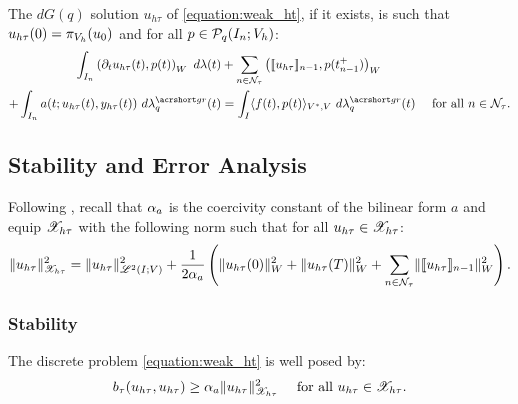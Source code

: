 \begin{proposition}[Localization]
    The $dG(q)$ solution $u_{h \tau}$ of \cref{equation:weak_ht}, if it exists, is such that $u_{h \tau}(0) = \pi_{V_h}(u_0)$ and for all $p \in \mathcal{P}_{q}(I_n; V_h)$:
    \begin{align}
        \int_{I_n} \left( \partial_t u_{h \tau}(t), p(t) \right)_W ~ d \lambda(t) & + \sum_{n \in \TimeIndices} \left( \llbracket u_{h \tau} \rrbracket_{n - 1}, p(t_{n - 1}^+) \right)_W \notag \\
        + \int_{I_n} a(t; u_{h \tau}(t), y_{h \tau}(t)) ~ d \lambdaGR_q(t) & = \int_I \langle f(t), p(t) \rangle_{V^*, V} ~ d \lambdaGR_q(t) &\text{ for all } n \in \TimeIndices.
    \end{align}
\end{proposition}

\newpage
\subsection{Stability and Error Analysis} \label{subsection:method_analysis}

Following \cite[p.~186]{Ern2021}, recall that $\alpha_{a}$ is the coercivity constant of the bilinear form $a$ and equip $\mathscr{X}_{h \tau}$ with the following norm such that for all $u_{h \tau} \in \mathscr{X}_{h \tau}$:
\begin{align}
    \lVert u_{h \tau} \rVert_{\mathscr{X}_{h \tau}}^2 = \lVert u_{h \tau} \rVert_{\mathscr{L}^{2}(I; V)}^2 + \frac{1}{2 \alpha_{a}} \left( \lVert u_{h \tau}(0) \rVert_W^2 + \lVert u_{h \tau}(T) \rVert_W^2 + \sum_{n \in \mathcal{N}_{\tau}} \lVert \llbracket u_{h \tau} \rrbracket_{n - 1} \rVert_W^2 \right). \label{eq:norm_ht}
\end{align}

\subsubsection{Stability}

\begin{lemma}[Coercivity]
    The discrete problem \cref{equation:weak_ht} is well posed by:
    \begin{align}
        b_{\tau}(u_{h \tau}, u_{h \tau}) &\geq \alpha_{a} \lVert u_{h \tau} \rVert_{\mathscr{X}_{h \tau}}^2 &\text{ for all } u_{h \tau} \in \mathscr{X}_{h \tau}. \label{eq:b_coercivity}
    \end{align}
\end{lemma}

